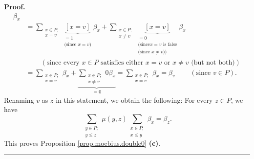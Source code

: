 \documentclass[numbers=enddot,12pt,final,onecolumn,notitlepage]{scrartcl}%
\theoremstyle{definition}
\newenvironment{proof}[1][Proof]{\noindent\textbf{#1.} }{\ \rule{0.5em}{0.5em}}
\newenvironment{verlong}{}{}
\let\sumnonlimits\sum
\renewcommand{\sum}{\sumnonlimits\limits}
\begin{document}
\begin{verlong}
\begin{proof}
\begin{align*}
\beta_{x}\\
&  =\sum_{\substack{x\in P;\\x=v}}\underbrace{\left[  x=v\right]
}_{\substack{=1\\\text{(since }x=v\text{)}}}\beta_{x}+\sum_{\substack{x\in
P;\\x\neq v}}\underbrace{\left[  x=v\right]  }_{\substack{=0\\\text{(since
}x=v\text{ is false}\\\text{(since }x\neq v\text{))}}}\beta_{x}\\
&  \ \ \ \ \ \ \ \ \ \ \left(  \text{since every }x\in P\text{ satisfies
either }x=v\text{ or }x\neq v\text{ (but not both)}\right) \\
&  =\sum_{\substack{x\in P;\\x=v}}\beta_{x}+\underbrace{\sum_{\substack{x\in
P;\\x\neq v}}0\beta_{x}}_{=0}=\sum_{\substack{x\in P;\\x=v}}\beta_{x}%
=\beta_{v}\ \ \ \ \ \ \ \ \ \ \left(  \text{since }v\in P\right)  .
\end{align*}
Renaming $v$ as $z$ in this statement, we obtain the following: For every
$z\in P$, we have%
\[
\sum_{\substack{y\in P;\\y\leq z}}\mu\left(  y,z\right)  \sum_{\substack{x\in
P;\\x\leq y}}\beta_{x}=\beta_{z}.
\]
This proves Proposition \ref{prop.moebius.double0} \textbf{(c)}.
\end{proof}
\end{verlong}
\end{document}
